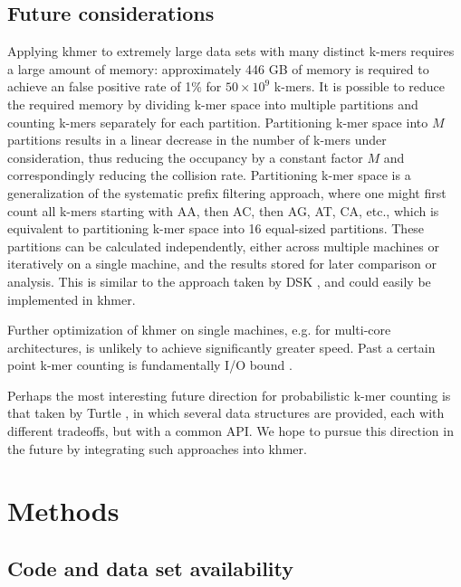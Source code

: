 \subsection{Future considerations}

Applying khmer to extremely large data sets with many distinct k-mers
requires a large amount of memory: approximately 446 GB of memory is
required to achieve an false positive rate of 1\% for $50\times 10^9$
k-mers. It is possible to reduce the required memory by dividing k-mer
space into multiple partitions and counting k-mers separately for each
partition. Partitioning k-mer space into $M$ partitions results in a
linear decrease in the number of k-mers under consideration, thus
reducing the occupancy by a constant factor $M$ and correspondingly
reducing the collision rate.  Partitioning k-mer space is a
generalization of the systematic prefix filtering approach, where one
might first count all k-mers starting with AA, then AC, then AG, AT,
CA, etc., which is equivalent to partitioning k-mer space into 16
equal-sized partitions. These partitions can be calculated
independently, either across multiple machines or iteratively on a
single machine, and the results stored for later comparison or
analysis.  This is similar to the approach taken by DSK
\cite{Rizk2013}, and could easily be implemented in khmer.

Further optimization of khmer on single machines, e.g. for multi-core
architectures, is unlikely to achieve significantly greater speed.
Past a certain point k-mer counting is fundamentally I/O bound
\cite{McDonald2013}.

Perhaps the most interesting future direction for probabilistic k-mer
counting is that taken by Turtle \cite{Roy2014}, in which several data
structures are provided, each with different tradeoffs, but with a
common API.  We hope to pursue this direction in the future by
integrating such approaches into khmer.

\section{Methods}

\subsection{Code and data set availability}

